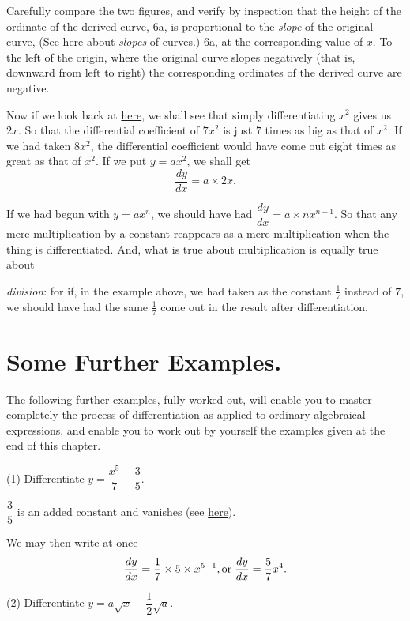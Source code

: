 \documentclass{ximera}
\begin{document}
{{\newpage

Carefully compare the two figures, and verify by
inspection that the height of the ordinate of the
derived curve, 6a, is proportional to the {\emph{slope}} of
the original curve, (See \href{http://calculusmadeeasy.org/10.html#slope}{here} about {\emph{slopes}} of curves.)
6a, at the corresponding value
of $x$. To the left of the origin, where the original
curve slopes negatively (that is, downward from left
to right) the corresponding ordinates of the derived
curve are negative.

Now if we look back at \href{http://calculusmadeeasy.org/4.html#diffexample}{here}, we shall see that
simply differentiating $x^2$ gives us $2x$. So that the
differential coefficient of $7x^2$ is just $7$ times as big as
that of $x^2$. If we had taken $8x^2$, the differential
coefficient would have come out eight times as great
as that of $x^2$. If we put $y = ax^2$, we shall get
\[
\frac{dy}{dx} = a \times 2x.
\]

If we had begun with $y = ax^n$, we should have had
$\dfrac{dy}{dx} = a \times nx^{n-1}$. So that any mere multiplication by
a constant reappears as a mere multiplication when
the thing is differentiated. And, what is true about
multiplication is equally true about {\emph{division}: for if,
in the example above, we had taken as the constant $\frac{1}{7}$
instead of $7$, we should have had the same $\frac{1}{7}$ come
out in the result after differentiation.

\section{Some Further Examples.}

The following further examples, fully worked out,
will enable you to master completely the process of
differentiation as applied to ordinary algebraical expressions,
and enable you to work out by yourself the
examples given at the end of this chapter.

(1) Differentiate $y = \dfrac{x^5}{7} - \dfrac{3}{5}$.

$\dfrac{3}{5}$ is an added constant and vanishes (see \href{http://calculusmadeeasy.org/5.html#addconst}{here}).

We may then write at once
\[
\frac{dy}{dx} = \frac{1}{7} \times 5 \times x^{5-1}, \\
 \text{or}\;
\frac{dy}{dx} = \frac{5}{7} x^4.
\]

(2) Differentiate $y = a\sqrt{x} - \dfrac{1}{2}\sqrt{a}$.

}}}
\end{document}
